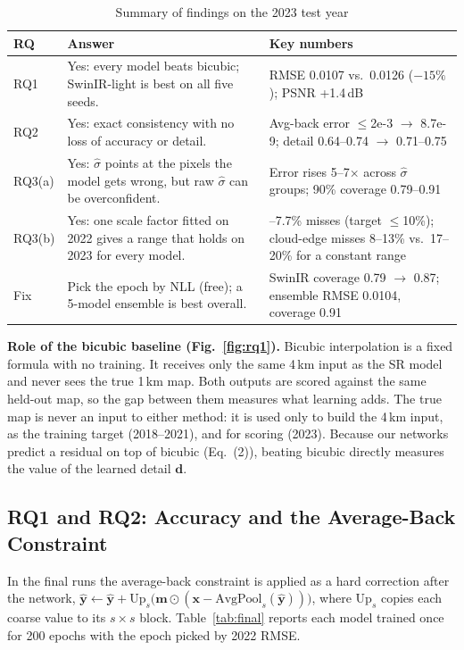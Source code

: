 \documentclass[conference]{IEEEtran}
\begin{document}
\begin{table}[htbp]
\caption{Summary of findings on the 2023 test year}
\label{tab:summary}
\centering\footnotesize
\setlength{\tabcolsep}{3pt}
\renewcommand{\arraystretch}{1.1}
\begin{tabularx}{\columnwidth}{@{}l >{\raggedright\arraybackslash}X >{\raggedright\arraybackslash}X@{}}
\toprule
\textbf{RQ} & \textbf{Answer} & \textbf{Key numbers} \\
\midrule
RQ1 & Yes: every model beats bicubic; SwinIR-light is best on all five seeds. & RMSE 0.0107 vs.\ 0.0126 (\(-15\%\)); PSNR +1.4\,dB \\
RQ2 & Yes: exact consistency with no loss of accuracy or detail. & Avg-back error \(\le\)2e-3 \(\to\) 8.7e-9; detail 0.64--0.74 \(\to\) 0.71--0.75 \\
RQ3(a) & Yes: \(\hat\sigma\) points at the pixels the model gets wrong, but raw \(\hat\sigma\) can be overconfident. & Error rises 5--7\(\times\) across \(\hat\sigma\) groups; 90\% coverage 0.79--0.91 \\
RQ3(b) & Yes: one scale factor fitted on 2022 gives a range that holds on 2023 for every model. & 6.4--7.7\% misses (target \(\le\)10\%); cloud-edge misses 8--13\% vs.\ 17--20\% for a constant range \\
Fix & Pick the epoch by NLL (free); a 5-model ensemble is best overall. & SwinIR coverage 0.79 \(\to\) 0.87; ensemble RMSE 0.0104, coverage 0.91 \\
\bottomrule
\end{tabularx}
\end{table}

\textbf{Role of the bicubic baseline (Fig.~\ref{fig:rq1}).} Bicubic interpolation is a fixed formula with no training. It receives only the same 4\,km input as the SR model and never sees the true 1\,km map. Both outputs are scored against the same held-out map, so the gap between them measures what learning adds. The true map is never an input to either method: it is used only to build the 4\,km input, as the training target (2018--2021), and for scoring (2023). Because our networks predict a residual on top of bicubic (Eq.~(2)), beating bicubic directly measures the value of the learned detail \(\mathbf{d}\).

\subsection{RQ1 and RQ2: Accuracy and the Average-Back Constraint}
In the final runs the average-back constraint is applied as a hard correction after the network, \(\hat{\mathbf{y}} \leftarrow \hat{\mathbf{y}} + \mathrm{Up}_s\big(\mathbf{m}\odot(\mathbf{x}-\mathrm{AvgPool}_s(\hat{\mathbf{y}}))\big)\), where \(\mathrm{Up}_s\) copies each coarse value to its \(s\times s\) block. Table~\ref{tab:final} reports each model trained once for 200 epochs with the epoch picked by 2022 RMSE.
\end{document}
